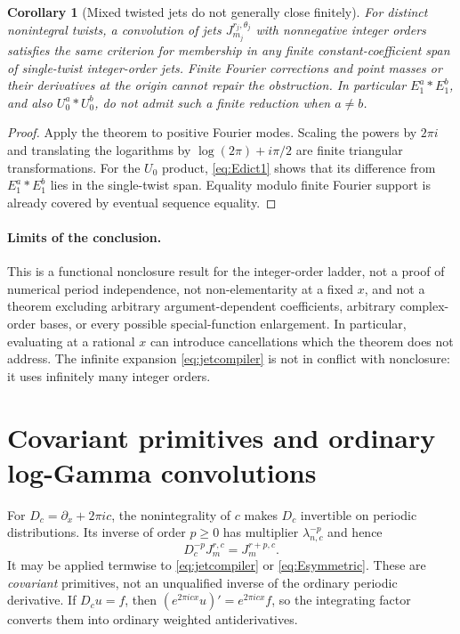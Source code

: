 \documentclass[11pt,a4paper]{article}
\numberwithin{equation}{section}
\newtheorem{corollary}[theorem]{Corollary}
\theoremstyle{definition}\newtheorem{definition}[theorem]{Definition}
\theoremstyle{remark}\newtheorem{remark}[theorem]{Remark}
\begin{document}
\begin{corollary}[Mixed twisted jets do not generally close finitely]
\label{cor:nonclosure}
For distinct nonintegral twists, a convolution of jets
$J_{m_j}^{r_j,\theta_j}$ with nonnegative integer orders satisfies the
same criterion for membership in any finite constant-coefficient span
of single-twist integer-order jets. Finite Fourier corrections and
point masses or their derivatives at the origin cannot repair the
obstruction. In particular $E_1^a*E_1^b$, and also $U_0^a*U_0^b$, do
not admit such a finite reduction when $a\ne b$.
\end{corollary}
\begin{proof}
Apply the theorem to positive Fourier modes. Scaling the powers by
$2\pi i$ and translating the logarithms by $\log(2\pi)+i\pi/2$ are
finite triangular transformations. For the $U_0$ product,
\eqref{eq:Edict1} shows that its difference from $E_1^a*E_1^b$ lies
in the single-twist span. Equality modulo finite Fourier support is
already covered by eventual sequence equality.
\end{proof}

\paragraph{Limits of the conclusion.}
This is a functional nonclosure result for the integer-order ladder,
not a proof of numerical period independence, not non-elementarity at
a fixed $x$, and not a theorem excluding arbitrary argument-dependent
coefficients, arbitrary complex-order bases, or every possible
special-function enlargement. In particular, evaluating at a rational
$x$ can introduce cancellations which the theorem does not address.
The infinite expansion \eqref{eq:jetcompiler} is not in conflict with
nonclosure: it uses infinitely many integer orders.

\section{Covariant primitives and ordinary log-Gamma convolutions}
\label{sec:gamma}
For $D_c=\partial_x+2\pi ic$, the nonintegrality of $c$ makes $D_c$
invertible on periodic distributions. Its inverse of order $p\ge0$
has multiplier $\lambda_{n,c}^{-p}$ and hence
\begin{equation}
 D_c^{-p}J_m^{r,c}=J_m^{r+p,c}.
 \label{eq:primitive}
\end{equation}
It may be applied termwise to \eqref{eq:jetcompiler} or
\eqref{eq:Esymmetric}. These are \emph{covariant} primitives, not
an unqualified inverse of the ordinary periodic derivative. If
$D_cu=f$, then $(e^{2\pi icx}u)'=e^{2\pi icx}f$, so the integrating
factor converts them into ordinary weighted antiderivatives.
\end{document}
